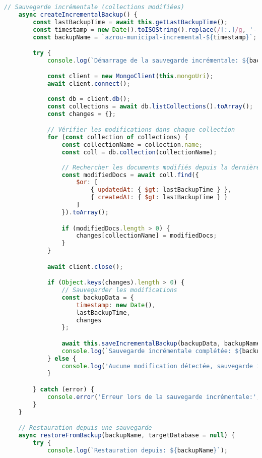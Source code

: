 \begin{lstlisting}[language=JavaScript, caption=backup-script.js]
    // Sauvegarde incrémentale (collections modifiées)
    async createIncrementalBackup() {
        const lastBackupTime = await this.getLastBackupTime();
        const timestamp = new Date().toISOString().replace(/[:.]/g, '-');
        const backupName = `azrou-municipal-incremental-${timestamp}`;

        try {
            console.log(`Démarrage de la sauvegarde incrémentale: ${backupName}`);

            const client = new MongoClient(this.mongoUri);
            await client.connect();
            
            const db = client.db();
            const collections = await db.listCollections().toArray();
            const changes = {};

            // Vérifier les modifications dans chaque collection
            for (const collection of collections) {
                const collectionName = collection.name;
                const coll = db.collection(collectionName);
                
                // Rechercher les documents modifiés depuis la dernière sauvegarde
                const modifiedDocs = await coll.find({
                    $or: [
                        { updatedAt: { $gt: lastBackupTime } },
                        { createdAt: { $gt: lastBackupTime } }
                    ]
                }).toArray();

                if (modifiedDocs.length > 0) {
                    changes[collectionName] = modifiedDocs;
                }
            }

            await client.close();

            if (Object.keys(changes).length > 0) {
                // Sauvegarder les modifications
                const backupData = {
                    timestamp: new Date(),
                    lastBackupTime,
                    changes
                };

                await this.saveIncrementalBackup(backupData, backupName);
                console.log(`Sauvegarde incrémentale complétée: ${backupName}`);
            } else {
                console.log('Aucune modification détectée, sauvegarde incrémentale ignorée');
            }

        } catch (error) {
            console.error('Erreur lors de la sauvegarde incrémentale:', error);
        }
    }

    // Restauration depuis une sauvegarde
    async restoreFromBackup(backupName, targetDatabase = null) {
        try {
            console.log(`Restauration depuis: ${backupName}`);


\end{lstlisting}
